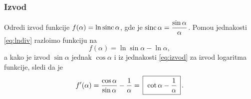 \subsubsection{Izvod}

\def\sinc{\mathop{\rm sinc}}
\zadatak Odredi izvod funkcije $f(\alpha)=\ln\sinc\alpha$, gde je  
$\displaystyle{\sinc\alpha=\frac{\sin\alpha}{\alpha}}$.
\resenje Pomo{\cc}u jednakosti \eqref{eq:lndiv} razlo{\zv}imo funkciju na 
$$f(\alpha)=\ln\sin\alpha-\ln\alpha,$$ 
a kako je izvod $\sin\alpha$ jednak $\cos\alpha$ i iz jednakosti 
\eqref{eq:izvod} za izvod logaritma funkcije, sledi da je
$$
f'(\alpha)
=\frac{\cos\alpha}{\sin\alpha} - \frac1\alpha
=\ram{\cot\alpha - \frac1\alpha}.
$$
